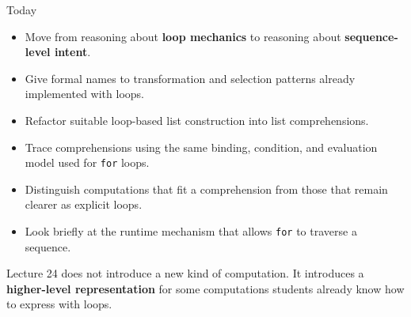 \documentclass[aspectratio=169,10pt]{beamer}
\begin{document}
\makedecktitle

\begin{frame}{Today}
  \begin{itemize}
    \item Move from reasoning about \textbf{loop mechanics} to reasoning about \textbf{sequence-level intent}.
    \item Give formal names to transformation and selection patterns already implemented with loops.
    \item Refactor suitable loop-based list construction into list comprehensions.
    \item Trace comprehensions using the same binding, condition, and evaluation model used for \texttt{for} loops.
    \item Distinguish computations that fit a comprehension from those that remain clearer as explicit loops.
    \item Look briefly at the runtime mechanism that allows \texttt{for} to traverse a sequence.
  \end{itemize}

  \begin{keyidea}
    Lecture 24 does not introduce a new kind of computation. It introduces a \textbf{higher-level representation} for some computations students already know how to express with loops.
  \end{keyidea}
\end{frame}
\end{document}
